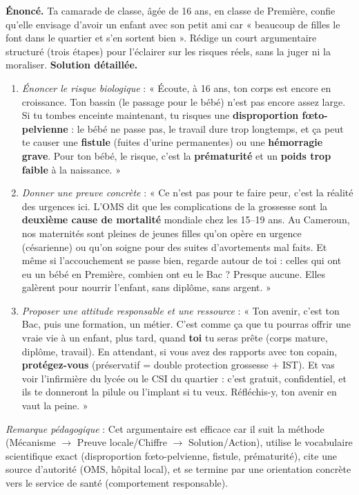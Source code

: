 \documentclass[11pt]{article}
\begin{document}
\begin{exoresolu}
\textbf{Énoncé.} Ta camarade de classe, âgée de 16 ans, en classe de Première, confie qu'elle envisage d'avoir un enfant avec son petit ami car « beaucoup de filles le font dans le quartier et s'en sortent bien ». Rédige un court argumentaire structuré (trois étapes) pour l'éclairer sur les risques réels, sans la juger ni la moraliser.
\tcblower
\textbf{Solution détaillée.}
\begin{enumerate}
\item \emph{Énoncer le risque biologique} : « Écoute, à 16 ans, ton corps est encore en croissance. Ton bassin (le passage pour le bébé) n'est pas encore assez large. Si tu tombes enceinte maintenant, tu risques une \textbf{disproportion fœto-pelvienne} : le bébé ne passe pas, le travail dure trop longtemps, et ça peut te causer une \textbf{fistule} (fuites d'urine permanentes) ou une \textbf{hémorragie grave}. Pour ton bébé, le risque, c'est la \textbf{prématurité} et un \textbf{poids trop faible} à la naissance. »
\item \emph{Donner une preuve concrète} : « Ce n'est pas pour te faire peur, c'est la réalité des urgences ici. L'OMS dit que les complications de la grossesse sont la \textbf{deuxième cause de mortalité} mondiale chez les 15--19 ans. Au Cameroun, nos maternités sont pleines de jeunes filles qu'on opère en urgence (césarienne) ou qu'on soigne pour des suites d'avortements mal faits. Et même si l'accouchement se passe bien, regarde autour de toi : celles qui ont eu un bébé en Première, combien ont eu le Bac ? Presque aucune. Elles galèrent pour nourrir l'enfant, sans diplôme, sans argent. »
\item \emph{Proposer une attitude responsable et une ressource} : « Ton avenir, c'est ton Bac, puis une formation, un métier. C'est comme ça que tu pourras offrir une vraie vie à un enfant, plus tard, quand \textbf{toi} tu seras prête (corps mature, diplôme, travail). En attendant, si vous avez des rapports avec ton copain, \textbf{protégez-vous} (préservatif = double protection grossesse + IST). Et vas voir l'infirmière du lycée ou le CSI du quartier : c'est gratuit, confidentiel, et ils te donneront la pilule ou l'implant si tu veux. Réfléchis-y, ton avenir en vaut la peine. »
\end{enumerate}
\emph{Remarque pédagogique} : Cet argumentaire est efficace car il suit la méthode (Mécanisme $\rightarrow$ Preuve locale/Chiffre $\rightarrow$ Solution/Action), utilise le vocabulaire scientifique exact (disproportion fœto-pelvienne, fistule, prématurité), cite une source d'autorité (OMS, hôpital local), et se termine par une orientation concrète vers le service de santé (comportement responsable).
\end{exoresolu}
\end{document}
